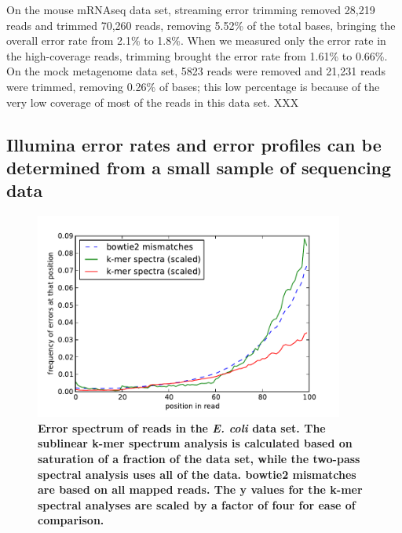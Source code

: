 \documentclass{article}
\begin{document}
%


% 


On the mouse mRNAseq data set, streaming error trimming removed 28,219
reads and trimmed 70,260 reads, removing 5.52\% of the total bases,
bringing the overall error rate from 2.1\% to 1.8\%.  When we measured
only the error rate in the high-coverage reads, trimming brought the
error rate from 1.61\% to 0.66\%.  On the mock metagenome data set,
5823 reads were removed and 21,231 reads were trimmed, removing 0.26\%
of bases; this low percentage is because of the very low coverage of
most of the reads in this data set.  XXX

\subsection{Illumina error rates and error profiles can be determined from a
small sample of sequencing data}

\begin{figure}[!ht]
 \centerline{\includegraphics[width=4in]{./figures/ecoli-errhist}}
\caption{{\bf Error spectrum of reads in the {\em E. coli} data
    set. The sublinear k-mer spectrum analysis is calculated based on
    saturation of a fraction of the data set, while the two-pass
    spectral analysis uses all of the data.  bowtie2 mismatches are
    based on all mapped reads.  The y values for the k-mer spectral
    analyses are scaled by a factor of four for ease of comparison.}}
\label{fig:ecoli_err}
\end{figure}
\end{document}
